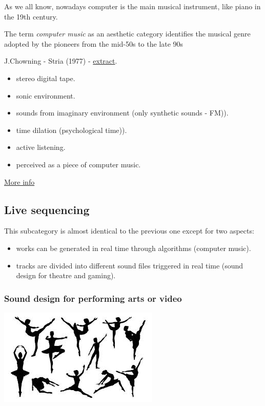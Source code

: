 As we all know, nowadays computer is the main musical instrument, like piano in the 19th century.

The term \textit{computer music} as an aesthetic category identifies the musical genre adopted by the pioneers from the mid-50s to the late 90s

J.Chowning - Stria (1977) - \href{suoni/chowning.mp3}{extract}.

\begin{itemize}
\tightlist
\item stereo digital tape.
\item sonic environment.
\item sounds from imaginary environment (only synthetic sounds - FM)).
\item time dilation (psychological time)).
\item active listening.
\item perceived as a piece of computer music.
\end{itemize}

\href{img/max.pdf}{More info}

\subsection{Live sequencing}\label{live-sequencing}

This subcategory is almost identical to the previous one except for two aspects: 

\begin{itemize}
\tightlist
\item works can be generated in real time through algorithms (computer music). 
\item tracks are divided into different sound files triggered in real time (sound design for theatre and gaming).
\end{itemize}

\subsubsection{Sound design for performing arts or video }\label{sound-design-for-performing-arts-or-video}

\begin{center}
\includegraphics[scale=0.7]{../img/danza.png}
\end{center}

